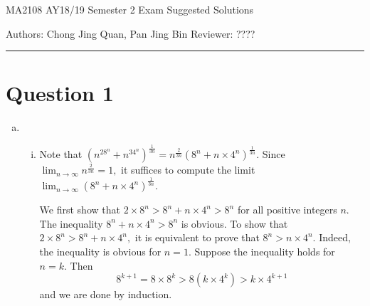 \documentclass{article}
\begin{document}
    {\LARGE{MA2108 AY18/19 Semester 2 Exam Suggested Solutions}}
    \vspace{0.2in}
    
    Authors: Chong Jing Quan, Pan Jing Bin \hfill Reviewer: ????
    
    \par\noindent\rule{\textwidth}{0.4pt}
\section*{Question 1}
\begin{enumerate}[(a)]
    \item \begin{enumerate}[(i)]
        \item Note that $\displaystyle(n^28^n+n^34^n)^{\frac{1}{3n}}=n^{\frac{2}{3n}}(8^n+n\times4^n)^{\frac{1}{3n}}.$ Since $\displaystyle\lim_{n\to\infty}n^{\frac{2}{3n}}=1,$ it suffices to compute the limit \newline $\displaystyle\lim_{n\to\infty}(8^n+n\times4^n)^{\frac{1}{3n}}.$
        
        We first show that $2\times8^n>8^n+n\times4^n>8^n$ for all positive integers $n.$ The inequality $8^n+n\times 4^n>8^n$ is obvious. To show that $2\times8^n>8^n+n\times4^n,$ it is equivalent to prove that $8^n>n\times4^n.$ Indeed, the inequality is obvious for $n=1.$ Suppose the inequality holds for $n=k.$ Then $$8^{k+1}=8\times8^k>8(k\times 4^k)>k\times 4^{k+1}$$ and we are done by induction.
        

\end{enumerate}
\end{enumerate}
\end{document}
